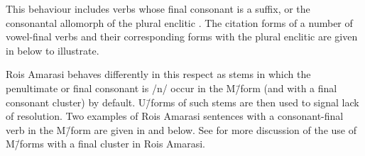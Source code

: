 \begin{exe}
	\label{ex:ConFinVerCitFor}
\end{exe}

This behaviour includes verbs whose final consonant is a suffix,
or the consonantal allomorph of the plural enclitic .
The citation forms of a number of vowel-final verbs
and their corresponding forms with the plural enclitic 
are given in  below to illustrate.

\begin{exe}
	\label{ex:PluVer}
\end{exe}

Ro{\Q}is Amarasi behaves differently in this respect
as stems in which the penultimate or final consonant
is /n/ occur in the M\=/form (and with a final consonant cluster) by default.
U\=/forms of such stems are then used to signal lack of resolution.
Two examples of Ro{\Q}is Amarasi sentences with a consonant-final
verb in the M\=/form are given in 
and  below.
See  for more discussion of the
use of M\=/forms with a final cluster in Ro{\Q}is Amarasi.

